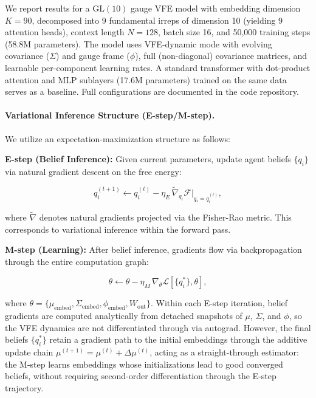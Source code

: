 \documentclass[twoside,11pt]{article}
\begin{document}
We report results for a $\mathrm{GL}(10)$ gauge VFE model with embedding dimension $K = 90$, decomposed into 9 fundamental irreps of dimension 10 (yielding 9 attention heads), context length $N = 128$, batch size 16, and 50{,}000 training steps (58.8M parameters). The model uses VFE-dynamic mode with evolving covariance ($\Sigma$) and gauge frame ($\phi$), full (non-diagonal) covariance matrices, and learnable per-component learning rates. A standard transformer with dot-product attention and MLP sublayers (17.6M parameters) trained on the same data serves as a baseline. Full configurations are documented in the code repository.


\paragraph{Variational Inference Structure (E-step/M-step).}
We utilize an expectation-maximization structure as follows:

\textbf{E-step (Belief Inference):} Given current parameters, update agent beliefs $\{q_i\}$ via natural gradient descent on the free energy:

\begin{equation}
q_i^{(t+1)} \leftarrow q_i^{(t)} - \eta_E \, \tilde{\nabla}_{q_i} \mathcal{F}\big|_{q_i = q_i^{(t)}},
\end{equation}

where $\tilde{\nabla}$ denotes natural gradients projected via the Fisher-Rao metric. This corresponds to variational inference within the forward pass.

\textbf{M-step (Learning):} After belief inference, gradients flow via backpropagation through the entire computation graph:

\begin{equation}
\theta \leftarrow \theta - \eta_M \, \nabla_{\theta} \mathcal{L}[\{q_i^*\}, \theta],
\end{equation}

where $\theta = \{\mu_{\text{embed}}, \Sigma_{\text{embed}}, \phi_{\text{embed}}, W_{\text{out}}\}$. Within each E-step iteration, belief gradients are computed analytically from detached snapshots of $\mu$, $\Sigma$, and $\phi$, so the VFE dynamics are not differentiated through via autograd. However, the final beliefs $\{q_i^*\}$ retain a gradient path to the initial embeddings through the additive update chain $\mu^{(t+1)} = \mu^{(t)} + \Delta\mu^{(t)}$, acting as a straight-through estimator: the M-step learns embeddings whose initializations lead to good converged beliefs, without requiring second-order differentiation through the E-step trajectory.
\end{document}
